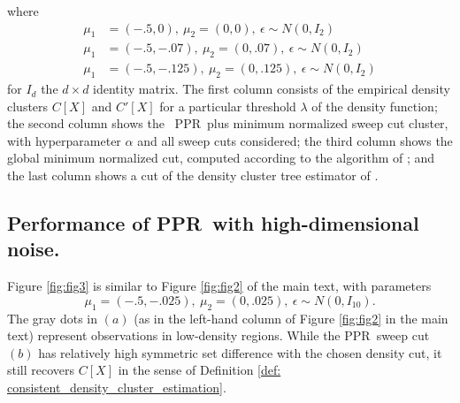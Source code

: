 \documentclass{article}
\newcommand{\1}{\mathbf{1}}
\newcommand{\Xbf}{X}             %
\newcommand{\pprspace}{{\sc PPR~}}
\theoremstyle{aldenthm}
\theoremstyle{aldenrmrk}
\begin{document}
where 
\begin{align*}
\mu_1 & = (-.5, 0),~ \mu_2 = (0,0),~ \epsilon \sim N(0, I_2) \tag{row 1} \\
\mu_1 & = (-.5, -.07),~ \mu_2 = (0,.07),~ \epsilon \sim N(0, I_2) \tag{row 2} \\
\mu_1 & = (-.5, -.125),~ \mu_2 = (0,.125),~ \epsilon \sim N(0, I_2) \tag{row 3} 
\end{align*}
for $I_d$ the $d \times d$ identity matrix. The first column consists of the empirical density clusters $C[\Xbf]$ and $C'[\Xbf]$ for a particular threshold $\lambda$ of the density function; the second column shows the ~\pprspace plus minimum normalized sweep cut cluster, with hyperparameter $\alpha$ and all sweep cuts considered; the third column shows the global minimum normalized cut, computed according to the algorithm of \cite{szlam2010}; and the last column shows a cut of the density cluster tree estimator of \cite{chaudhuri2010}.

\subsection{Performance of \pprspace with high-dimensional noise.}

Figure \ref{fig:fig3} is similar to Figure \ref{fig:fig2} of the main text, with parameters
\begin{equation*}
\mu_1 = (-.5, -.025),~ \mu_2 = (0,.025),~ \epsilon \sim N(0, I_{10}).
\end{equation*}
The gray dots in $(a)$ (as in the left-hand column of Figure \ref{fig:fig2} in the main text) represent observations in low-density regions. While the \pprspace sweep cut $(b)$ has relatively high symmetric set difference with the chosen density cut, it still recovers $C[\Xbf]$ in the sense of Definition \ref{def: consistent_density_cluster_estimation}.
\end{document}
